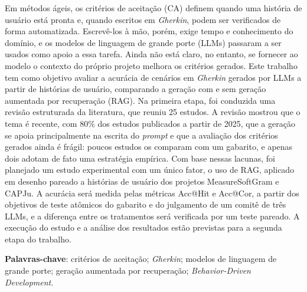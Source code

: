 \begin{resumo}
 Em métodos ágeis, os critérios de aceitação (CA) definem quando uma história de usuário está pronta e, quando escritos em \textit{Gherkin}, podem ser verificados de forma automatizada. Escrevê-los à mão, porém, exige tempo e conhecimento do domínio, e os modelos de linguagem de grande porte (LLMs) passaram a ser usados como apoio a essa tarefa. Ainda não está claro, no entanto, se fornecer ao modelo o contexto do próprio projeto melhora os critérios gerados. Este trabalho tem como objetivo avaliar a acurácia de cenários em \textit{Gherkin} gerados por LLMs a partir de histórias de usuário, comparando a geração com e sem geração aumentada por recuperação (RAG). Na primeira etapa, foi conduzida uma revisão estruturada da literatura, que reuniu 25 estudos. A revisão mostrou que o tema é recente, com 80\% dos estudos publicados a partir de 2025, que a geração se apoia principalmente na escrita do \textit{prompt} e que a avaliação dos critérios gerados ainda é frágil: poucos estudos os comparam com um gabarito, e apenas dois adotam de fato uma estratégia empírica. Com base nessas lacunas, foi planejado um estudo experimental com um único fator, o uso de RAG, aplicado em desenho pareado a histórias de usuário dos projetos MeasureSoftGram e CAPJu. A acurácia será medida pelas métricas Acc@Hit e Acc@Cor, a partir dos objetivos de teste atômicos do gabarito e do julgamento de um comitê de três LLMs, e a diferença entre os tratamentos será verificada por um teste pareado. A execução do estudo e a análise dos resultados estão previstas para a segunda etapa do trabalho.

 \vspace{\onelineskip}

 \noindent
 \textbf{Palavras-chave}: critérios de aceitação; \textit{Gherkin}; modelos de linguagem de grande porte; geração aumentada por recuperação; \textit{Behavior-Driven Development}.
\end{resumo}
